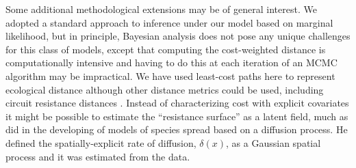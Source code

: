 \documentclass[12pt]{article}
\begin{document}
\begin{spacing}{1.8}
Some additional methodological extensions may be of general interest.
We adopted a standard approach to inference under our model based on
marginal likelihood, but in principle,
Bayesian analysis does not pose any unique challenges for this
class of models, except that computing the cost-weighted distance is
computationally intensive and having to do this at each iteration of
an MCMC algorithm may be impractical. We have used least-cost paths here to represent ecological distance
although other distance metrics could be used, including circuit
resistance distances \citep{mcrae:2006}. Instead of
characterizing cost with explicit covariates it might be possible to
estimate the ``resistance surface'' as a latent field, much as
\citep{wikle:2003} did in the developing of models of species spread
based on a diffusion process. He defined the spatially-explicit rate
of diffusion, $\delta(x)$, as a Gaussian spatial process and it was
estimated from the data.









\newpage





\end{spacing}



\clearpage

\newpage
\end{document}
